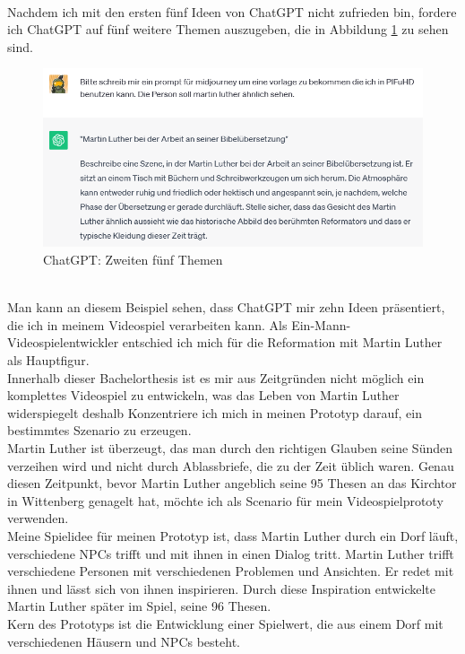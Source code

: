 \\
Nachdem ich mit den ersten fünf Ideen von ChatGPT nicht zufrieden bin, fordere ich ChatGPT auf fünf weitere Themen auszugeben, die in Abbildung \ref{zweiten-5-themen} zu sehen sind.
\begin{figure}[h]
	\centering
	\includegraphics[width=14cm]{BilderFuerBA/02.png}
	\caption{ChatGPT: Zweiten fünf Themen}
	\label{zweiten-5-themen}
\end{figure}
\\
Man kann an diesem Beispiel sehen, dass ChatGPT mir zehn Ideen präsentiert, die ich in meinem Videospiel verarbeiten kann. Als Ein-Mann-Videospielentwickler entschied ich mich für die Reformation mit Martin Luther als Hauptfigur.
\\
Innerhalb dieser Bachelorthesis ist es mir aus Zeitgründen nicht möglich ein komplettes Videospiel zu entwickeln, was das Leben von Martin Luther widerspiegelt deshalb Konzentriere ich mich in meinen Prototyp darauf, ein bestimmtes Szenario zu erzeugen.
\\
Martin Luther ist überzeugt, das man durch den richtigen Glauben seine Sünden verzeihen wird und nicht durch Ablassbriefe, die zu der Zeit üblich waren. Genau diesen Zeitpunkt, bevor Martin Luther angeblich seine 95 Thesen an das Kirchtor in Wittenberg genagelt hat, möchte ich als Scenario für mein Videospielprototy verwenden.
\\
Meine Spielidee für meinen Prototyp ist, dass Martin Luther durch ein Dorf läuft, verschiedene NPCs trifft und mit ihnen in einen Dialog tritt. Martin Luther trifft verschiedene Personen mit verschiedenen Problemen und Ansichten. Er redet mit ihnen und lässt sich von ihnen inspirieren. Durch diese Inspiration entwickelte Martin Luther später im Spiel, seine 96 Thesen.
\\
Kern des Prototyps ist die Entwicklung einer Spielwert, die aus einem Dorf mit verschiedenen Häusern und NPCs besteht.
\\
